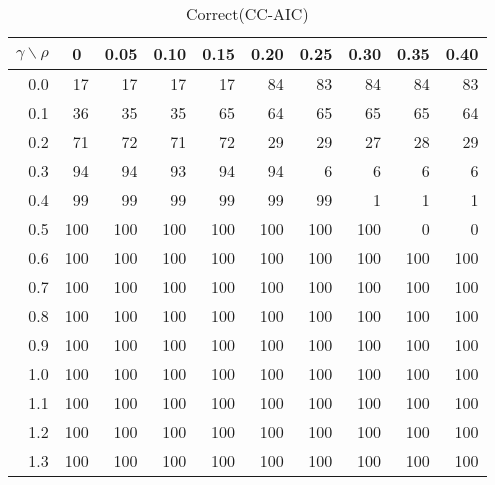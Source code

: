 \documentclass[12pt]{article}
\begin{document}
%
\begin{table}[!tbp]
\caption{Correct(CC-AIC)}
 \begin{center}
 \begin{tabular}{r|rrrrrrrrr}\hline\hline
\multicolumn{1}{c|}{$\gamma\backslash\rho$}&\multicolumn{1}{c}{0}&\multicolumn{1}{c}{0.05}&\multicolumn{1}{c}{0.10}&\multicolumn{1}{c}{0.15}&\multicolumn{1}{c}{0.20}&\multicolumn{1}{c}{0.25}&\multicolumn{1}{c}{0.30}&\multicolumn{1}{c}{0.35}&\multicolumn{1}{c}{0.40}\tabularnewline
\hline

0.0& 17& 17& 17& 17& 84& 83& 84& 84& 83\tabularnewline
0.1& 36& 35& 35& 65& 64& 65& 65& 65& 64\tabularnewline
0.2& 71& 72& 71& 72& 29& 29& 27& 28& 29\tabularnewline
0.3& 94& 94& 93& 94& 94&  6&  6&  6&  6\tabularnewline
0.4& 99& 99& 99& 99& 99& 99&  1&  1&  1\tabularnewline
0.5&100&100&100&100&100&100&100&  0&  0\tabularnewline
0.6&100&100&100&100&100&100&100&100&100\tabularnewline
0.7&100&100&100&100&100&100&100&100&100\tabularnewline
0.8&100&100&100&100&100&100&100&100&100\tabularnewline
0.9&100&100&100&100&100&100&100&100&100\tabularnewline
1.0&100&100&100&100&100&100&100&100&100\tabularnewline
1.1&100&100&100&100&100&100&100&100&100\tabularnewline
1.2&100&100&100&100&100&100&100&100&100\tabularnewline
1.3&100&100&100&100&100&100&100&100&100\tabularnewline
\hline
\end{tabular}

\end{center}

\end{table}
\end{document}
